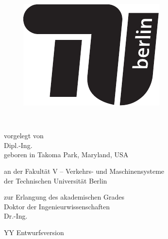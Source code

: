 
\thispagestyle{empty}

\begin{flushright}

	\begin{figure}[!h]
  	\begin{minipage}{1.8\linewidth}
	\begin{center}
	\includegraphics[scale=0.6]{chapters/title/TU-logo-kurz-1c-schwarz.pdf}
  	\end{center}
  	\end{minipage}
	\end{figure}

	\vspace{20mm}

	\LARGE

	\textbf{\hspace{60mm}\Title} \\[2cm]

	\hrulefill

	\large
	vorgelegt von\\

	Dipl.-Ing. \Autor\\
	geboren in Takoma Park, Maryland, USA\\
	\vspace{10mm}

	an der Fakultät V -- Verkehrs- und Maschinensysteme\\
	der Technischen Universität Berlin

	zur Erlangung des akademischen Grades\\
	Doktor der Ingenieurwissenschaften\\
	Dr.-Ing.\\
	\vspace{5mm}

	YY Entwurfsversion \\


\end{flushright}
